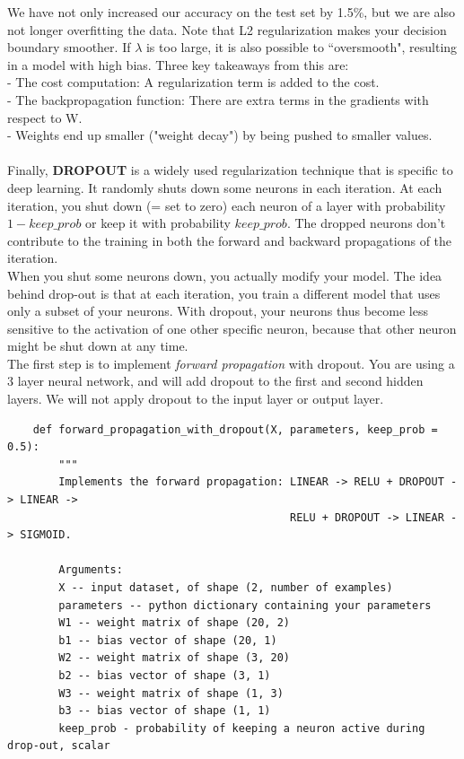 \documentclass[11pt, a4paper]{article}
\begin{document}
\begin{spacing}{1.1}
	We have not only increased our accuracy on the test set by 1.5\%, but we are also not longer overfitting the data. Note that L2 regularization makes your decision boundary smoother. If $\lambda$ is too large, it is also possible to ``oversmooth", resulting in a model with high bias. Three key takeaways from this are: \\
	\hspace*{3mm} - The cost computation: A regularization term is added to the cost. \\
	\hspace*{3mm} - The backpropagation function: There are extra terms in the gradients with respect to W. \\
	\hspace*{3mm} - Weights end up smaller ("weight decay") by being pushed to smaller values. \vspace*{2mm} \\~\\
	Finally, \textbf{DROPOUT} is a widely used regularization technique that is specific to deep learning. It randomly shuts down some neurons in each iteration. At each iteration, you shut down (= set to zero) each neuron of a layer with probability $1 - keep\_prob$ or keep it with probability $keep\_prob$. The dropped neurons don't contribute to the training in both the forward and backward propagations of the iteration. \vspace*{1mm} \\
	When you shut some neurons down, you actually modify your model. The idea behind drop-out is that at each iteration, you train a different model that uses only a subset of your neurons. With dropout, your neurons thus become less sensitive to the activation of one other specific neuron, because that other neuron might be shut down at any time.\vspace*{3mm} \\
	The first step is to implement \textit{forward propagation} with dropout. You are using a 3 layer neural network, and will add dropout to the first and second hidden layers. We will not apply dropout to the input layer or output layer. \newpage

	\begin{lstlisting}
	def forward_propagation_with_dropout(X, parameters, keep_prob = 0.5):
		"""
		Implements the forward propagation: LINEAR -> RELU + DROPOUT -> LINEAR -> 
		                                    RELU + DROPOUT -> LINEAR -> SIGMOID.
		
		Arguments:
		X -- input dataset, of shape (2, number of examples)
		parameters -- python dictionary containing your parameters
		W1 -- weight matrix of shape (20, 2)
		b1 -- bias vector of shape (20, 1)
		W2 -- weight matrix of shape (3, 20)
		b2 -- bias vector of shape (3, 1)
		W3 -- weight matrix of shape (1, 3)
		b3 -- bias vector of shape (1, 1)
		keep_prob - probability of keeping a neuron active during drop-out, scalar
		

\end{lstlisting}
\end{spacing}
\end{document}
